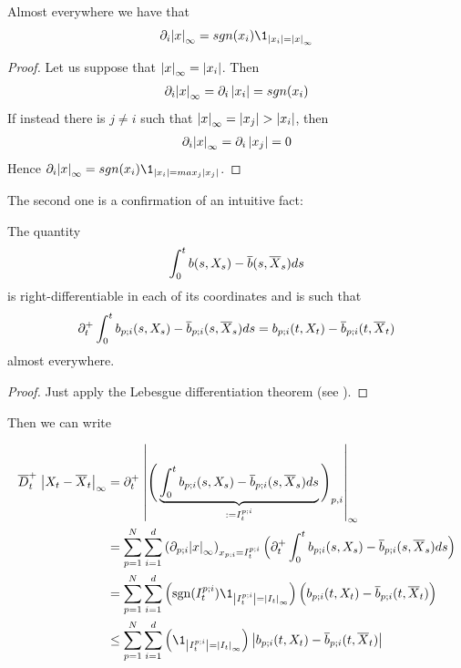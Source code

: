 \begin{lemma}\label{ch4:lemma:derive-infinity-norm}
	Almost everywhere we have that
	\begin{equation}
		\partial_i \normp{\infty}{x} = sgn(x_i)\1_{\abs{x_i} = \normp{\infty}{x}}
	\end{equation}
\end{lemma}
\begin{proof}
	Let us suppose that ${ \left| x \right|_{\infty} } = \left| x_i \right|$.
	Then
	\begin{align*}
		\partial_i { \left| x \right|_{\infty} } = \partial_i \left| x_i \right| = sgn(x_i)
	\end{align*}
	If instead there is $j \neq i$ such that ${ \left| x \right|_{\infty} } = \left| x_j \right| > \left| x_i \right|$, then
	\begin{align*}
		\partial_i { \left| x \right|_{\infty} } = \partial_i \left| x_j \right| = 0
	\end{align*}
	Hence $\partial_i \normp{\infty}{x} = sgn(x_i)\1_{\abs{x_i} = max_j \abs{x_j}}$.
\end{proof}

The second one is a confirmation of an intuitive fact:

\begin{lemma}\label{ch4:lemma:right-diff-of-integral}
	The quantity 
	\begin{equation}\label{ch4:derivation-of-lebesgue}
		\int_0^t b(s, X_s) - \overline{b}(s, \overline{X}_s) d s
	\end{equation}
	is right-differentiable in each of its coordinates and is such that
	\begin{equation}
		\partial_t^+ \int_0^t b_{p;i}(s, X_s) - \overline{b}_{p;i}(s, \overline{X}_s) d s = b_{p;i}(t, X_t) - \overline{b}_{p;i}(t, \overline{X}_t)
	\end{equation}
	almost everywhere.
\end{lemma}

\begin{proof}
	Just apply the Lebesgue differentiation theorem (see \autocite[Theorem 3.21]{folland}).
\end{proof}

Then we can write

\begin{align*}
	\diniu^+_t 
	\;
	\normp{\infty}{\sol_t-\mfsol_t} 
	&=
	\partial^+_t
	\;
	\normp{\infty}{
		\Bigg(
			\underbrace{ 
				\int_0^t \drift_{p;i}(s, \sol_s) - \mfdrift_{p;i}(s, \mfsol_s) d s
			}_{:= I_t^{p;i} }
		\Bigg)_{p,i}
	}
	\\
	& =
	\sum_{p=1}^{N}
	\sum_{i=1}^d
		\left( \partial_{p;i} \normp{\infty}{x} \right)_{x_{p;i} = I_t^{p;i}}
	\Big(
		\partial^+_t
		\int_0^t \drift_{p;i}(s, \sol_s) - \mfdrift_{p;i}(s, \mfsol_s) d s
	\Big)
	\\
	& =
	\sum_{p=1}^{N}
	\sum_{i=1}^d
	\left( \sgn(I_t^{p;i})\1_{\abs{I_t^{p;i}} = \normp{\infty}{I_t} } \right)
	\Big(
	\drift_{p;i}(t, \sol_t) - \mfdrift_{p;i}(t, \mfsol_t)
	\Big)
	\\
	& \leq
	\sum_{p=1}^{N}
	\sum_{i=1}^d
	\left( \1_{\abs{I_t^{p;i}} = \normp{\infty}{I_t} } \right)
	\abs{
		\drift_{p;i}(t, \sol_t) - \mfdrift_{p;i}(t, \mfsol_t)
	}
\end{align*}

